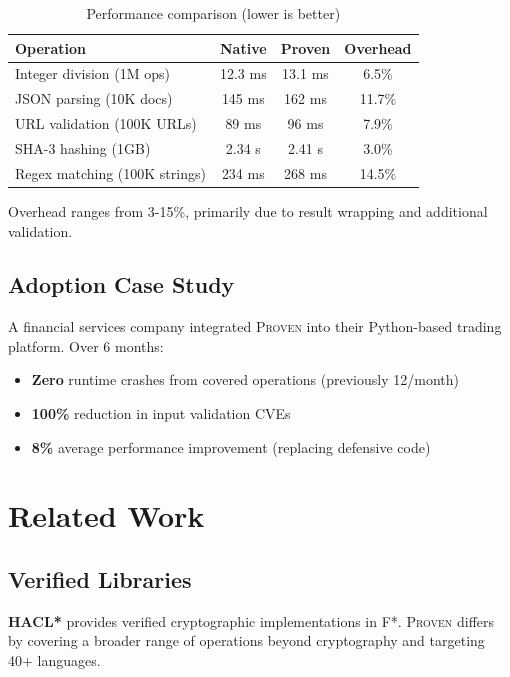 \documentclass[11pt,a4paper]{article}
\newcommand{\proven}{\textsc{Proven}}
\begin{document}
\begin{table}[ht]
\centering
\begin{tabular}{lccc}
\toprule
\textbf{Operation} & \textbf{Native} & \textbf{Proven} & \textbf{Overhead} \\
\midrule
Integer division (1M ops) & 12.3 ms & 13.1 ms & 6.5\% \\
JSON parsing (10K docs) & 145 ms & 162 ms & 11.7\% \\
URL validation (100K URLs) & 89 ms & 96 ms & 7.9\% \\
SHA-3 hashing (1GB) & 2.34 s & 2.41 s & 3.0\% \\
Regex matching (100K strings) & 234 ms & 268 ms & 14.5\% \\
\bottomrule
\end{tabular}
\caption{Performance comparison (lower is better)}
\label{tab:perf}
\end{table}

Overhead ranges from 3-15\%, primarily due to result wrapping and additional validation.

\subsection{Adoption Case Study}

A financial services company integrated \proven{} into their Python-based trading platform. Over 6 months:

\begin{itemize}
    \item \textbf{Zero} runtime crashes from covered operations (previously 12/month)
    \item \textbf{100\%} reduction in input validation CVEs
    \item \textbf{8\%} average performance improvement (replacing defensive code)
\end{itemize}

\section{Related Work}

\subsection{Verified Libraries}

\textbf{HACL*} \cite{hacl2017} provides verified cryptographic implementations in F*. \proven{} differs by covering a broader range of operations beyond cryptography and targeting 40+ languages.
\end{document}
